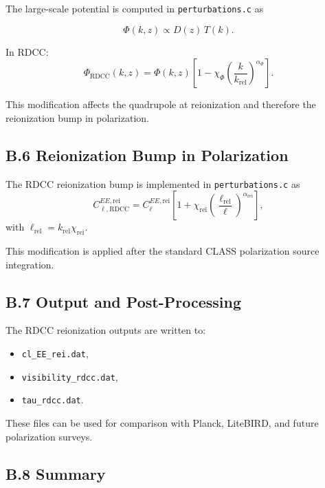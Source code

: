 \documentclass[11pt,a4paper]{article}
\begin{document}
The large-scale potential is computed in \texttt{perturbations.c} as


\[
\Phi(k,z) \propto D(z)\,T(k).
\]



In RDCC:
\begin{equation}
\Phi_{\mathrm{RDCC}}(k,z)
=
\Phi(k,z)
\left[
1
-
\chi_{\Phi}
\left(
\frac{k}{k_{\mathrm{rel}}}
\right)^{\alpha_{\Phi}}
\right].
\end{equation}

This modification affects the quadrupole at reionization and therefore the reionization bump in
polarization.

\subsection*{B.6 Reionization Bump in Polarization}

The RDCC reionization bump is implemented in \texttt{perturbations.c} as
\begin{equation}
C_{\ell,\mathrm{RDCC}}^{EE,\mathrm{rei}}
=
C_{\ell}^{EE,\mathrm{rei}}
\left[
1
+
\chi_{\mathrm{rei}}
\left(
\frac{\ell_{\mathrm{rel}}}{\ell}
\right)^{\alpha_{\mathrm{rei}}}
\right],
\end{equation}
with $\ell_{\mathrm{rel}} = k_{\mathrm{rel}}\chi_{\mathrm{rei}}$.

This modification is applied after the standard CLASS polarization source integration.

\subsection*{B.7 Output and Post-Processing}

The RDCC reionization outputs are written to:

\begin{itemize}
\item \texttt{cl\_EE\_rei.dat},
\item \texttt{visibility\_rdcc.dat},
\item \texttt{tau\_rdcc.dat}.
\end{itemize}

These files can be used for comparison with Planck, LiteBIRD, and future polarization surveys.

\subsection*{B.8 Summary}
\end{document}
